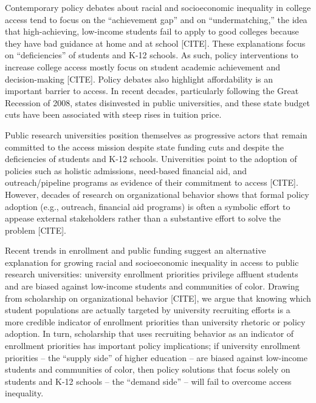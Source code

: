 \documentclass[twoside]{article}
\begin{document}
Contemporary policy debates about racial and socioeconomic inequality in college access tend to focus on the ``achievement gap'' and on ``undermatching,'' the idea that high-achieving, low-income students fail to apply to good colleges because they have bad guidance at home and at school [CITE].  These explanations focus on ``deficiencies'' of students and K-12 schools. As such, policy interventions to increase college access mostly focus on student academic achievement and decision-making [CITE]. Policy debates also highlight affordability is an important barrier to access. In recent decades, particularly following the Great Recession of 2008, states disinvested in public universities, and these state budget cuts have been associated with steep rises in tuition price. 

Public research universities position themselves as progressive actors that remain committed to the access mission despite state funding cuts and despite the deficiencies of students and K-12 schools. Universities point to the adoption of policies such as holistic admissions, need-based financial aid, and outreach/pipeline programs as evidence of their commitment to access [CITE].  However, decades of research on organizational behavior shows that formal policy adoption (e.g., outreach, financial aid programs) is often a symbolic effort to appease external stakeholders rather than a substantive effort to solve the problem [CITE].

Recent trends in enrollment and public funding suggest an alternative explanation for growing racial and socioeconomic inequality in access to public  research universities: university enrollment priorities privilege affluent students and are biased against low-income students and communities of color. Drawing from scholarship on organizational behavior [CITE], we argue that knowing which student populations are actually targeted by university recruiting efforts is a more credible indicator of enrollment priorities than university rhetoric or policy adoption. In turn, scholarship that uses recruiting behavior as an indicator of enrollment priorities has important policy implications; if university enrollment priorities -- the ``supply side'' of higher education -- are biased against low-income students and communities of color, then policy solutions that focus solely on students and K-12 schools -- the ``demand side'' -- will fail to overcome access inequality. 
\end{document}
